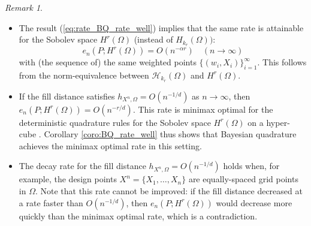 \documentclass[11pt]{article}
\theoremstyle{remark}
\newtheorem{remark}{Remark}
\theoremstyle{example}
\theoremstyle{remark}
\renewcommand{\H}{{\mathcal{H}}}
\newcommand{\N}{\mathbb{N}}
\begin{document}
\begin{remark} \rm
\begin{itemize}
\item The result (\ref{eq:rate_BQ_rate_well}) implies that the same rate is attainable for the Sobolev space $H^r(\Omega)$ (instead of $H_{k_r}(\Omega))$:
\begin{equation}  \label{eq:BQ_well_rate_204}
e_n(P;H^r(\Omega))  = O(n^{- \alpha r}) \quad (n \to \infty)
\end{equation}
with (the sequence of) the same weighted points $\{ (w_i,X_i) \}_{i=1}^\infty$.
This follows from the norm-equivalence between $\H_{k_r}(\Omega)$ and $H^r(\Omega)$.\vspace{-1mm}
\item
If the fill distance satisfies $h_{X^n,\Omega} = O(n^{-1/d})$ as $n \to \infty$, then $e_n(P; H^r(\Omega)) = O(n^{- r/d})$.
This rate is minimax optimal for the deterministic quadrature rules for the Sobolev space $H^r(\Omega)$ on a hyper-cube \cite[Proposition 1 in Section 1.3.12]{Nov88}. %
Corollary \ref{coro:BQ_rate_well} thus shows that Bayesian quadrature achieves the minimax optimal rate in this setting.\vspace{-1mm}
\item
The decay rate for the fill distance $h_{X^n,\Omega} = O(n^{-1/d})$ holds when, for example, the design points $X^n = \{ X_1,\dots,X_n \}$ are equally-spaced grid points in $\Omega$.
Note that this rate cannot be improved: if the fill distance decreased at a rate faster than $O(n^{-1/d})$, then $e_n(P; H^r(\Omega))$ would decrease more quickly than the minimax optimal rate, which is a contradiction.%
\end{itemize}%
\end{remark}
\end{document}
